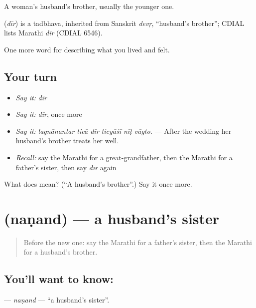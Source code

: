 A woman's husband's brother, usually the younger one.

\begin{cousinweb}
\textbf{} (\emph{dīr}) is a tadbhava, inherited from Sanskrit \emph{devṛ}, \textquotedblleft{}husband's brother\textquotedblright{}; CDIAL lists Marathi \emph{dīr} (CDIAL 6546).
\end{cousinweb}

\begin{grammarlens}[title={What you've built}]
One more word for describing what you lived and felt.
\end{grammarlens}

\subsection*{Your turn}
\begin{itemize}
\raggedright
  \item \emph{Say it:} \emph{dīr}
  \item \emph{Say it:} \emph{dīr}, once more
  \item \emph{Say it:} \emph{lagnānantar ticā dīr ticyāśī nīṭ vāgto.} — After the wedding her husband's brother treats her well.
  \item \emph{Recall:} say the Marathi for a great-grandfather, then the Marathi for a father's sister, then say \emph{dīr} again
\end{itemize}

\begin{tcolorbox}[breakable,colback=teal!4,colframe=teal!35!black,title={Before you move on}]
What does  mean? (\textquotedblleft{}A husband's brother\textquotedblright{}.) Say it once more.
\end{tcolorbox}
\section[\texorpdfstring{\mr{नणंद} (naṇand)}{नणंद (naṇand)}]{ (naṇand) — a husband's sister}

\label{lesson:MR-C496-nanand}



\begin{quote}
Before the new one: say the Marathi for a father's sister, then the Marathi for a husband's brother.
\end{quote}

\subsection*{You'll want to know: }
\textbf{} — \emph{naṇand} — \textquotedblleft{}a husband's sister\textquotedblright{}.

